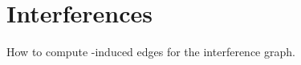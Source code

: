 \documentclass[12pt]{article}
\begin{document}
\section{\AMi Interferences}

How to compute \AMi-induced edges for the interference graph.

\begin{algorithm}
\end{algorithm}
\end{document}
